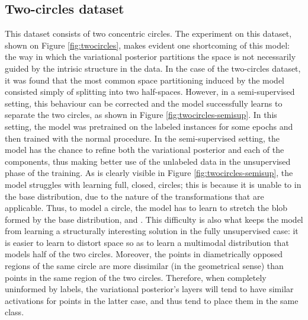 \subsection{Two-circles dataset}
This dataset consists of two concentric circles. The experiment on this dataset,
shown on Figure \ref{fig:twocircles}, makes evident one shortcoming of this
model: the way in which the variational posterior partitions the space is
not necessarily guided by the intrisic structure in the data. In the case of
the two-circles dataset, it was found that the most common space partitioning
induced by the model consisted simply of splitting into two half-spaces. However, in
a semi-supervised setting, this behaviour can be corrected and the model
successfully learns to separate the two circles, as shown in Figure
\ref{fig:twocircles-semisup}. In this setting, the model was pretrained on
the labeled instances for some epochs and then trained with the normal procedure.
In the semi-supervised setting, the model has the chance to refine both the
variational posterior and each of the components, thus making better use of
the unlabeled data in the unsupervised phase of the training. As is clearly
visible in Figure \ref{fig:twocircles-semisup}, the model struggles with
learning full, closed, circles; this is because it is unable to 
in the base distribution, due to the nature of the transformations that are
applicable. Thus, to model a circle, the model has to learn to stretch the blob
formed by the base distribution, and . This difficulty
is also what keeps the model from learning a structurally interesting solution
in the fully unsupervised case: it is easier to learn to distort space so as to
learn a multimodal distribution that models half of the two circles. Moreover,
the points in diametrically opposed regions of the same circle are more dissimilar
(in the geometrical sense) than points in the same region of the two circles.
Therefore, when completely uninformed by labels, the variational posterior's
layers will tend to have similar activations for points in the latter case, and
thus tend to place them in the same class.

